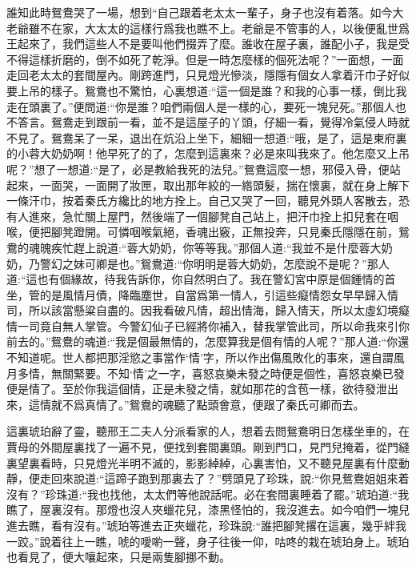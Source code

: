 \begin{parag}
    誰知此時鴛鴦哭了一場，想到“自己跟着老太太一輩子，身子也沒有着落。如今大老爺雖不在家，大太太的這樣行爲我也瞧不上。老爺是不管事的人，以後便亂世爲王起來了，我們這些人不是要叫他們掇弄了麼。誰收在屋子裏，誰配小子，我是受不得這樣折磨的，倒不如死了乾淨。但是一時怎麼樣的個死法呢？”一面想，一面走回老太太的套間屋內。剛跨進門，只見燈光慘淡，隱隱有個女人拿着汗巾子好似要上吊的樣子。鴛鴦也不驚怕，心裏想道:“這一個是誰？和我的心事一樣，倒比我走在頭裏了。”便問道:“你是誰？咱們兩個人是一樣的心，要死一塊兒死。”那個人也不答言。鴛鴦走到跟前一看，並不是這屋子的丫頭，仔細一看，覺得冷氣侵人時就不見了。鴛鴦呆了一呆，退出在炕沿上坐下，細細一想道:“哦，是了，這是東府裏的小蓉大奶奶啊！他早死了的了，怎麼到這裏來？必是來叫我來了。他怎麼又上吊呢？”想了一想道:“是了，必是教給我死的法兒。”鴛鴦這麼一想，邪侵入骨，便站起來，一面哭，一面開了妝匣，取出那年絞的一綹頭髮，揣在懷裏，就在身上解下一條汗巾，按着秦氏方纔比的地方拴上。自己又哭了一回，聽見外頭人客散去，恐有人進來，急忙關上屋門，然後端了一個腳凳自己站上，把汗巾拴上扣兒套在咽喉，便把腳凳蹬開。可憐咽喉氣絕，香魂出竅，正無投奔，只見秦氏隱隱在前，鴛鴦的魂魄疾忙趕上說道:“蓉大奶奶，你等等我。”那個人道:“我並不是什麼蓉大奶奶，乃警幻之妹可卿是也。”鴛鴦道:“你明明是蓉大奶奶，怎麼說不是呢？”那人道:“這也有個緣故，待我告訴你，你自然明白了。我在警幻宮中原是個鍾情的首坐，管的是風情月債，降臨塵世，自當爲第一情人，引這些癡情怨女早早歸入情司，所以該當懸粱自盡的。因我看破凡情，超出情海，歸入情天，所以太虛幻境癡情一司竟自無人掌管。今警幻仙子已經將你補入，替我掌管此司，所以命我來引你前去的。”鴛鴦的魂道:“我是個最無情的，怎麼算我是個有情的人呢？”那人道:“你還不知道呢。世人都把那淫慾之事當作‘情’字，所以作出傷風敗化的事來，還自謂風月多情，無關緊要。不知‘情’之一字，喜怒哀樂未發之時便是個性，喜怒哀樂已發便是情了。至於你我這個情，正是未發之情，就如那花的含苞一樣，欲待發泄出來，這情就不爲真情了。”鴛鴦的魂聽了點頭會意，便跟了秦氏可卿而去。
\end{parag}


\begin{parag}
    這裏琥珀辭了靈，聽邢王二夫人分派看家的人，想着去問鴛鴦明日怎樣坐車的，在賈母的外間屋裏找了一遍不見，便找到套間裏頭。剛到門口，見門兒掩着，從門縫裏望裏看時，只見燈光半明不滅的，影影綽綽，心裏害怕，又不聽見屋裏有什麼動靜，便走回來說道:“這蹄子跑到那裏去了？”劈頭見了珍珠，說:“你見鴛鴦姐姐來着沒有？”珍珠道:“我也找他，太太們等他說話呢。必在套間裏睡着了罷。”琥珀道:“我瞧了，屋裏沒有。那燈也沒人夾蠟花兒，漆黑怪怕的，我沒進去。如今咱們一塊兒進去瞧，看有沒有。”琥珀等進去正夾蠟花，珍珠說:“誰把腳凳撂在這裏，幾乎絆我一跤。”說着往上一瞧，唬的噯喲一聲，身子往後一仰，咕咚的栽在琥珀身上。琥珀也看見了，便大嚷起來，只是兩隻腳挪不動。
\end{parag}


